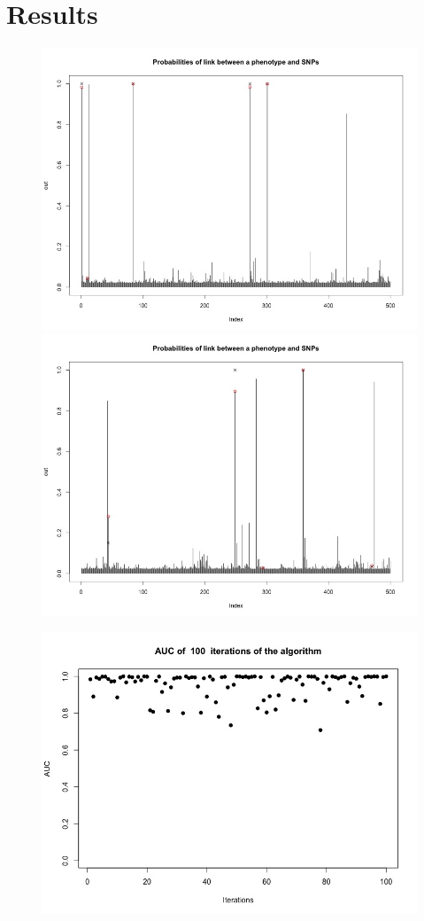 \documentclass{article}
\begin{document}
\section{Results}
\begin{figure}
\includegraphics[width=5in]{images/multipleProba1.jpg}
\includegraphics[width=5in]{images/multipleProba2.jpg}
\end{figure}

\begin{figure}
\includegraphics[width=5in]{images/AUC_100_iter.jpeg}
\end{figure}
\end{document}
